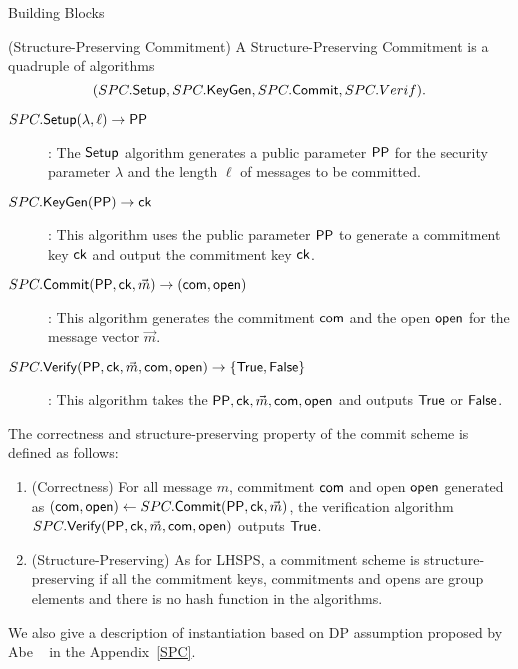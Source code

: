\begin{subsection}{Building Blocks}
  \begin{myDef}{(Structure-Preserving Commitment)}
    A Structure-Preserving Commitment is a quadruple of algorithms
    $$(SPC.{\mathsf{Setup}}, SPC.{\mathsf{KeyGen}}, SPC.{\mathsf{Commit}}, SPC.Verif).$$
    \begin{description}
    \item[$\boldmath{SPC.{\mathsf{Setup}}(\lambda, \ell) \to \mathsf{PP}}$]: The ${\mathsf{Setup}}$ algorithm generates a public parameter $\mathsf{PP}$ for the security parameter $\lambda$ and the length $\ell$ of messages to be committed.
    \item[$\boldmath{SPC.{\mathsf{KeyGen}}(\mathsf{PP}) \to \mathsf{ck}}$]: This algorithm uses the public parameter $\mathsf{PP}$ to generate a commitment key $\mathsf{ck}$ and output the commitment key $\mathsf{ck}$.
    \item[$\boldmath{SPC.{\mathsf{Commit}}(\mathsf{PP}, \mathsf{ck}, \vec{m}) \to (\mathsf{com}, \mathsf{open})}$]: This algorithm generates the commitment $\mathsf{com}$ and the open $\mathsf{open}$ for the message vector $\vec{m}$.
    \item[$\boldmath{SPC.{\mathsf{Verify}}(\mathsf{PP},\mathsf{ck}, \vec{m}, \mathsf{com}, \mathsf{open}) \to \{\mathsf{True}, \mathsf{False}\}}$]:  This algorithm takes the $\mathsf{PP}, \mathsf{ck}, \vec{m}, \mathsf{com}, \mathsf{open}$ and outputs $\mathsf{True}$ or $\mathsf{False}$.
    \end{description}

    The correctness and structure-preserving property of the commit scheme is defined as follows:
    \begin{enumerate}
    \item (Correctness) For all message $m$, commitment $\mathsf{com}$ and open $\mathsf{open}$ generated as $(\mathsf{com}, \mathsf{open}) \gets SPC.{\mathsf{Commit}}(\mathsf{PP}, \mathsf{ck}, \vec{m})$, the verification algorithm $SPC.{\mathsf{Verify}}(\mathsf{PP},\mathsf{ck}, \vec{m}, \mathsf{com}, \mathsf{open})$ outputs $\mathsf{True}$.
      
    \item (Structure-Preserving) As for LHSPS, a commitment scheme is structure-preserving if all the commitment keys, commitments and opens are group elements and there is no hash function in the algorithms. 
    \end{enumerate}
    
  \end{myDef}

  We also give a description of instantiation based on DP assumption proposed by Abe \etal~\cite{DBLP:conf/eurocrypt/AbeKOT15} in the Appendix~\ref{SPC}.


\end{subsection}
